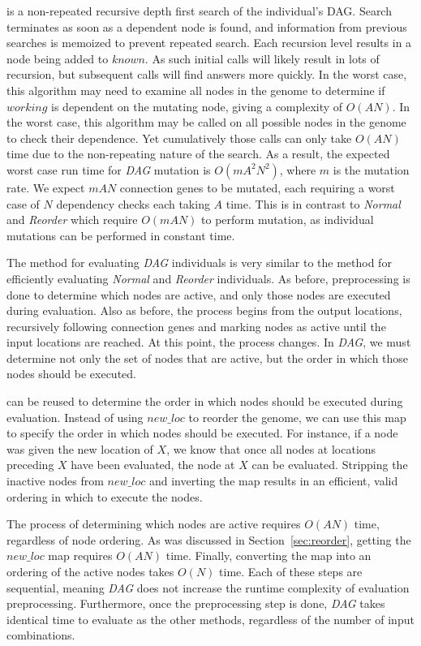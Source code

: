 \documentclass[journal]{IEEEtran}
\begin{document}
 is a non-repeated recursive depth
first search of the individual's DAG.  Search terminates as soon as a dependent
node is found, and information from previous searches is memoized to prevent
repeated search.  Each recursion level results in a node being added to $known$.
As such initial calls will likely result in lots of recursion, but subsequent
calls will find answers more quickly.  In the worst case, this algorithm may need
to examine all nodes in the genome to determine if $working$ is dependent on the
mutating node, giving  a complexity of $O(AN)$.  In the worst case, this algorithm
may be called on all possible nodes in the genome to check their dependence.
Yet cumulatively those calls can only take $O(AN)$ time due to the non-repeating
nature of the search.  As a result, the expected worst case run time for \emph{DAG}
mutation is $O(mA^2N^2)$, where $m$ is the mutation rate.  We expect $mAN$
connection genes to be mutated, each requiring a worst case of $N$ dependency checks
each taking $A$ time.
This is in contrast to \emph{Normal} and \emph{Reorder} which require $O(mAN)$ to perform
mutation, as individual mutations can be performed in constant time.

The method for evaluating \emph{DAG} individuals is very similar to the method for
efficiently evaluating \emph{Normal} and \emph{Reorder} individuals.  As before,
preprocessing is done to determine which nodes are active, and only those nodes are
executed during evaluation.  Also as before, the process begins from the output locations,
recursively following connection genes and marking nodes as active until the input locations
are reached.  At this point, the process changes.  In \emph{DAG}, we must determine not only the set of
nodes that are active, but the order in which those nodes should be executed.

 can be reused to determine the order
in which nodes should be executed during evaluation.  Instead of using $new\_loc$
to reorder the genome, we can use this map to specify the order in which nodes should be
executed.  For instance, if a node was given the new location of $X$, we know
that once all nodes at locations preceding $X$ have been evaluated, the node at $X$
can be evaluated.  Stripping the inactive nodes from $new\_loc$ and inverting the map
results in an efficient, valid ordering in which to execute the nodes.

The process of determining which nodes are active requires $O(AN)$ time, regardless
of node ordering.  As was discussed in Section~\ref{sec:reorder},
getting the $new\_loc$ map requires $O(AN)$ time.  Finally, converting the map
into an ordering of the active nodes takes $O(N)$ time.  Each of these steps are
sequential, meaning \emph{DAG} does not increase the runtime complexity of evaluation
preprocessing.  Furthermore, once the preprocessing step is done, \emph{DAG} takes
identical time to evaluate as the other methods, regardless of the number of
input combinations.
\end{document}
